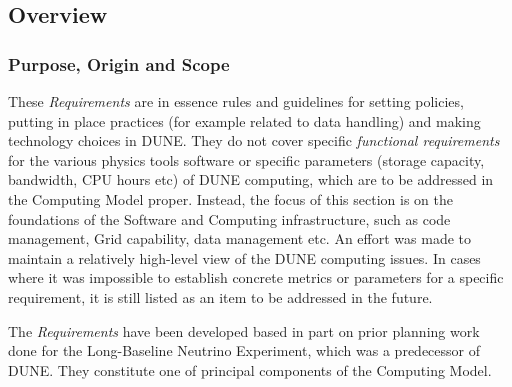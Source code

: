 \subsection{Overview}
\subsubsection{Purpose, Origin and Scope}

These \textit{Requirements} are in essence rules and guidelines for setting policies, putting in place practices (for example related to data handling)
and making technology choices in DUNE. They do not cover specific \textit{functional requirements} for the various physics tools software
or specific parameters (storage capacity, bandwidth, CPU hours etc) of DUNE computing, which are to be addressed in the Computing Model proper.
Instead, the focus of this section is on the foundations of the Software and Computing infrastructure, such as code management, Grid capability, data management etc.
An effort was made to maintain a relatively high-level view of the DUNE computing issues. In cases where it was impossible to establish concrete metrics or parameters
for a specific requirement, it is still listed as an item to be addressed in the future.

The \textit{Requirements} have been developed based in part on prior planning work done for the Long-Baseline Neutrino Experiment, which was a predecessor of DUNE.
They constitute one of principal components of the Computing Model. 





